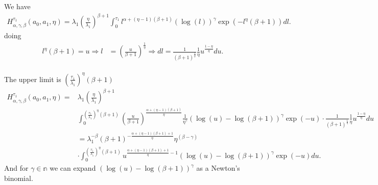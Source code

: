 \documentclass{article}
\begin{document}
We have
\begin{align*}
H_{\alpha,\gamma,\beta}^{\tau_1}(a_0,a_1,\eta)=\lambda_1\left(\frac{\eta}{\lambda_1}\right)^{\beta+1}\int_{0}^{\tau_1} l^{\alpha+(\eta-1)(\beta+1)}\left(\log(l)\right)^{\gamma}\exp\left(-l^{\eta}(\beta+1)\right)dl.
\end{align*}
doing
\begin{align*}
l^{\eta}(\beta+1)=u \Rightarrow l&=\left(\frac{u}{\beta+1}\right)^{\frac{1}{\eta}}\Rightarrow dl=\frac{1}{(\beta+1)^{\frac{1}{\eta}}}\frac{1}{\eta}u^{\frac{1-\eta}{\eta}}du.
\end{align*}
\\
The upper limit is $\left(\frac{\tau_1}{\lambda_1}\right)^{\eta}(\beta+1)$
\\
\begin{align*}
H_{\alpha,\gamma,\beta}^{\tau_1}(a_0,a_1,\eta)=&\lambda_1\left(\frac{\eta}{\lambda_1}\right)^{\beta+1}
\\
&\int_{0}^{\left(\frac{\tau_1}{\lambda_1}\right)^{\eta}(\beta+1)} \left(\frac{u}{\beta+1}\right)^{\frac{\alpha+(\eta-1)(\beta+1)}{\eta}}\frac{1}{\eta^{\gamma}}\left(\log(u)-\log(\beta+1)\right)^\gamma \exp(-u)\cdot \frac{1}{(\beta+1)^{\frac{1}{\eta}}}\frac{1}{\eta}u^{\frac{1-\eta}{\eta}}du
\\
&=\lambda_1^{-\beta}(\beta+1)^{-\frac{\alpha+(\eta-1)(\beta+1)+1}{\eta}}\eta^{(\beta-\gamma)}
\\
&\cdot\int_{0}^{\left(\frac{\tau_1}{\lambda_1}\right)^{\eta}(\beta+1)} u^{\frac{\alpha+(\eta-1)(\beta+1)+1}{\eta}-1}\left(\log(u)-\log(\beta+1)\right)^\gamma \exp(-u)du.
\end{align*}
And for $\gamma \in \mathbb{n}$ we can expand $\left(\log(u)-\log(\beta+1)\right)^\gamma$ as a Newton's binomial.
\end{document}

